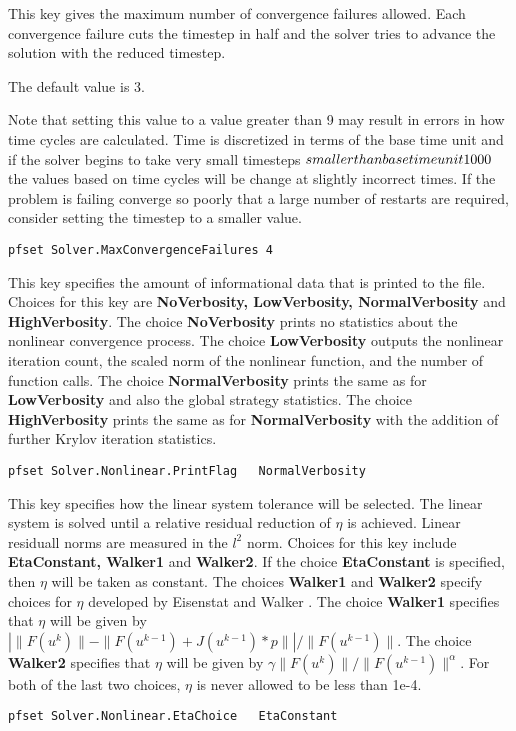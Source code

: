 {This key gives the maximum number of convergence failures
allowed.   Each convergence failure cuts the timestep 
in half and the solver tries to advance the solution with the reduced
timestep.

The default value is 3.   

Note that setting this value to a value greater than 9 may result in
errors in how time cycles are calculated.  Time is discretized in
terms of the base time unit and if the solver begins to take very
small timesteps \(smaller than base time unit \/ 1000\) the values based
on time cycles will be change at slightly incorrect times. If the
problem is failing converge so poorly that a large number of restarts are
required, consider setting the timestep to a smaller value.
}
\begin{display}\begin{verbatim}
pfset Solver.MaxConvergenceFailures 4
\end{verbatim}\end{display}

{This key specifies the amount of informational data that is printed to the
 file.  Choices for this key are {\bf NoVerbosity, 
LowVerbosity, NormalVerbosity} and {\bf  HighVerbosity}.  The choice 
{\bf NoVerbosity} prints no statistics about the nonlinear convergence
process.  The choice {\bf LowVerbosity} outputs the nonlinear iteration count, 
the scaled norm of the nonlinear function, and the number of function calls.
The choice {\bf NormalVerbosity} prints the same as for {\bf LowVerbosity} 
and also the global strategy statistics.  The choice {\bf HighVerbosity} prints
the same as for {\bf NormalVerbosity} with the addition of further Krylov 
iteration statistics.
}
\begin{display}\begin{verbatim}
pfset Solver.Nonlinear.PrintFlag   NormalVerbosity
\end{verbatim}\end{display}

{This key specifies how the linear system tolerance will be selected.  
The linear system is solved until a relative residual reduction of $\eta$ 
is achieved.  Linear residuall norms are measured in the $l^2$ norm.
Choices for this key include {\bf EtaConstant, Walker1} and 
{\bf Walker2}.  If the choice {\bf EtaConstant} is specified, then $\eta$ will
be taken as constant.  The choices {\bf Walker1} and {\bf Walker2} specify
choices for $\eta$ developed by Eisenstat and Walker \cite{EW96}.  The choice
{\bf Walker1} specifies that $\eta$ will be given by
$| \|F(u^k)\| - \|F(u^{k-1}) + J(u^{k-1})*p \|  |  / \|F(u^{k-1})\|$. The
choice {\bf Walker2} specifies that $\eta$ will be given by
$\gamma \|F(u^k)\| / \|F(u^{k-1})\|^{\alpha}$.  For both of the last two
choices, $\eta$ is never allowed to be less than 1e-4.
}
\begin{display}\begin{verbatim}
pfset Solver.Nonlinear.EtaChoice   EtaConstant
\end{verbatim}\end{display}


